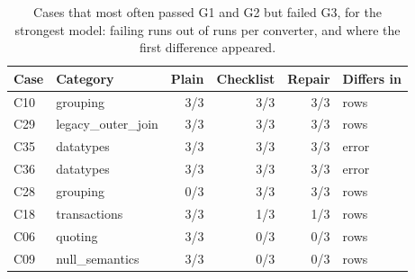 \begin{table}[t]
\centering
\caption{Cases that most often passed G1 and G2 but failed G3, for the strongest model: failing runs out of runs per converter, and where the first difference appeared.}
\label{tab:failures}
\footnotesize
\begin{tabular}{llrrrl}
\toprule
Case & Category & Plain & Checklist & Repair & Differs in \\
\midrule
C10 & grouping & 3/3 & 3/3 & 3/3 & rows \\
C29 & legacy\_outer\_join & 3/3 & 3/3 & 3/3 & rows \\
C35 & datatypes & 3/3 & 3/3 & 3/3 & error \\
C36 & datatypes & 3/3 & 3/3 & 3/3 & error \\
C28 & grouping & 0/3 & 3/3 & 3/3 & rows \\
C18 & transactions & 3/3 & 1/3 & 1/3 & rows \\
C06 & quoting & 3/3 & 0/3 & 0/3 & rows \\
C09 & null\_semantics & 3/3 & 0/3 & 0/3 & rows \\
\bottomrule
\end{tabular}
\end{table}
